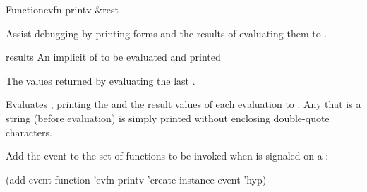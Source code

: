 \documentclass[10pt,twoside,english,pdftex]{article}
\begin{document}

\begin{functiondoc}{Function}{evfn-printv}{ 
    \&rest }
% 

\fnsyntax

\fnpurpose Assist debugging by printing forms and the results of
evaluating them to .

\fnpackage {}

\fnmodule {}

\fnargs
\begin{args}{results}
\arg[forms] An implicit  of  to be
evaluated and printed  
\end{args}

\fnreturns The values returned by evaluating the last .

\fndescription Evaluates , printing the  and the
result values of each evaluation to .
Any that is a string (before evaluation) is simply printed without
enclosing double-quote characters.

\fnexamples
{}%
Add the event   to the set of functions
to be invoked when  is signaled on a
 :
%
\W\supp
\begin{example}
  (add-event-function 'evfn-printv 'create-instance-event 'hyp)
\end{example}

\end{functiondoc}

\end{document}
